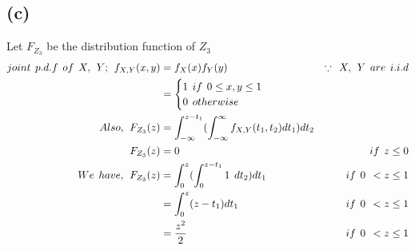 \documentclass[a4paper,fleqn,11pt]{article}
\theoremstyle{mytheor}
\begin{document}
\subsection*{(c)}
Let $F_{Z_3}$ be the distribution function of $Z_{3}$
\begin{align*}
joint \hspace{1ex} p.d.f \hspace{1ex} of \hspace{1ex} X, \hspace{1ex}Y; \hspace{1ex} f_{X,Y}(x,y) & = f_{X}(x)f_{Y}(y) & \because \hspace{1ex} X, \hspace{1ex} Y \hspace{1ex} are \hspace{1ex} i.i.d \\
& = \begin{cases}
	1 \hspace{1ex} if \hspace{1ex} 0 \leq x,y \leq 1 \\
	0 \hspace{1ex} otherwise \\
	\end{cases} \\
Also, \hspace{1ex} F_{Z_3}(z) & = \int_{-\infty}^{z - t_{1}} (\int_{-\infty}^{\infty} f_{X,Y}(t_{1},t_{2}) dt_{1}) dt_{2} \\
F_{Z_3}(z) & = 0 \hspace{1ex} & if \hspace{1ex} z \leq 0 \\
We \hspace{1ex} have, \hspace{1ex} F_{Z_3}(z) & =  \int_{0}^{z} (\int_{0}^{z - t_{1}} 1 \hspace{1ex} dt_{2}) dt_{1} \hspace{1ex} & if \hspace{1ex} 0 \hspace{1ex} < z \leq 1 \\
& = \int_{0}^{z} (z - t_{1}) dt_{1} \hspace{1ex} & if \hspace{1ex} 0 \hspace{1ex} < z \leq 1 \\
& = \frac{z^2 }{2} \hspace{1ex} & if \hspace{1ex} 0 \hspace{1ex} < z \leq 1 \\

\end{align*}
\end{document}
